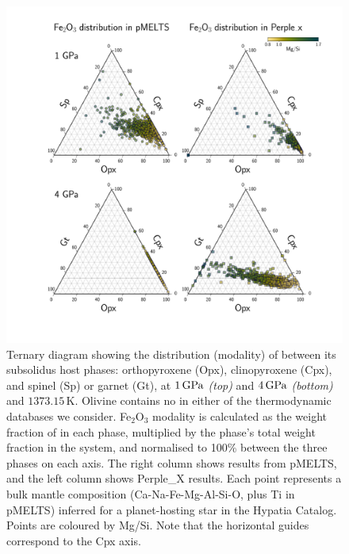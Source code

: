 \documentclass[fleqn,usenatbib,twocolumn]{mnras}
\begin{document}
\begin{figure}
\centering
\includegraphics[width=1\textwidth]{figs/ternary_subplots.pdf}
\caption{\label{fig:ferric_ternary}Ternary diagram showing the distribution (modality) of  between its subsolidus host phases: orthopyroxene (Opx), clinopyroxene (Cpx), and spinel (Sp) or garnet (Gt), at $1\,{\rm GPa}$ \textit{(top)} and $4\,{\rm GPa}$ \textit{(bottom)} and $1373.15\,\text{K}$. Olivine contains no  in either of the thermodynamic databases we consider. Fe$_2$O$_3$ modality is calculated as the weight fraction of  in each phase, multiplied by the phase's total weight fraction in the system, and normalised to 100\% between the three phases on each axis. The right column shows results from pMELTS, and the left column shows Perple\_X results. Each point represents a bulk mantle composition (Ca-Na-Fe-Mg-Al-Si-O, plus Ti in pMELTS) inferred for a planet-hosting star in the Hypatia Catalog. Points are coloured by Mg/Si. Note that the horizontal guides correspond to the Cpx axis.}
\end{figure}
\end{document}
